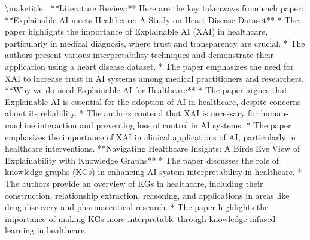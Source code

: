 \documentclass{article}%
\begin{document}
%
\normalsize%
\textbackslash{}maketitle%
\newline%
🔹 **Literature Review:**  \newline%
Here are the key takeaways from each paper:\newline%
\newline%
**Explainable AI meets Healthcare: A Study on Heart Disease Dataset**\newline%
\newline%
* The paper highlights the importance of Explainable AI (XAI) in healthcare, particularly in medical diagnosis, where trust and transparency are crucial.\newline%
* The authors present various interpretability techniques and demonstrate their application using a heart disease dataset.\newline%
* The paper emphasizes the need for XAI to increase trust in AI systems among medical practitioners and researchers.\newline%
\newline%
**Why we do need Explainable AI for Healthcare**\newline%
\newline%
* The paper argues that Explainable AI is essential for the adoption of AI in healthcare, despite concerns about its reliability.\newline%
* The authors contend that XAI is necessary for human{-}machine interaction and preventing loss of control in AI systems.\newline%
* The paper emphasizes the importance of XAI in clinical applications of AI, particularly in healthcare interventions.\newline%
\newline%
**Navigating Healthcare Insights: A Birds Eye View of Explainability with Knowledge Graphs**\newline%
\newline%
* The paper discusses the role of knowledge graphs (KGs) in enhancing AI system interpretability in healthcare.\newline%
* The authors provide an overview of KGs in healthcare, including their construction, relationship extraction, reasoning, and applications in areas like drug discovery and pharmaceutical research.\newline%
* The paper highlights the importance of making KGs more interpretable through knowledge{-}infused learning in healthcare.\newline%
\newline%
\end{document}

